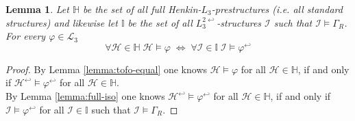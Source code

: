 \documentclass[11pt,a4paper]{article}
\newtheorem{lemma}[theorem]{Lemma}
\newcommand{\tofo}{\hookleftarrow}
\begin{document}
\begin{lemma}
\label{lemma:so-equ}
Let $\mathbb{H}$ be the set of all full Henkin-$L_3$-prestructures (i.e. all standard structures) and likewise let $\mathbb{I}$ be the set of all $L_3^{2\tofo}$-structures $\mathcal{I}$ such that  $\mathcal{I} \models \Gamma_R $. For every $\varphi \in \mathcal{L}_3$ 
\begin{equation*}
\forall \mathcal{H} \in \mathbb{H} \; \mathcal{H} \models \varphi \; \iff \; \forall \mathcal{I} \in \mathbb{I} \; \mathcal{I} \models \varphi^{\tofo}
\end{equation*}
\end{lemma}
\begin{proof}
By Lemma \ref{lemma:tofo-equal} one knows $\mathcal{H}\models \varphi$ for all $\mathcal{H}\in \mathbb{H}$, if and only if $\mathcal{H}^{\tofo}\models \varphi^{\tofo}$ for all $\mathcal{H}\in \mathbb{H}$. \\
By Lemma \ref{lemma:full-iso} one knows $\mathcal{H}^{\tofo}\models \varphi^{\tofo}$ for all $\mathcal{H}\in \mathbb{H}$, if and only if $\mathcal{I}\models \varphi^{\tofo}$ for all $\mathcal{I}\in \mathbb{I}$ such that $\mathcal{I} \models \Gamma_R$.
\end{proof}






















%	
\end{document}
